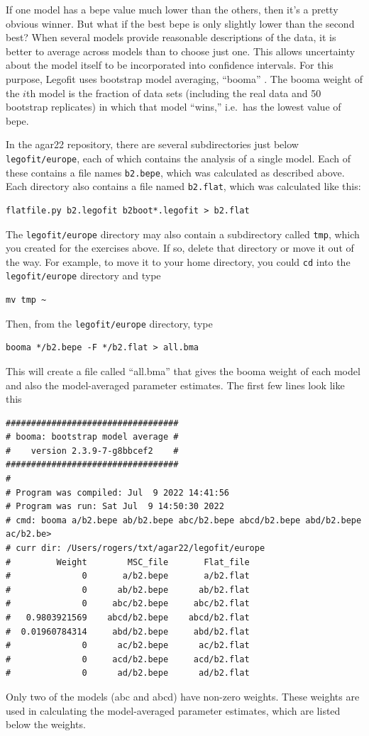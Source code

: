 \documentclass[11pt]{article}
\begin{document}
If one model has a bepe value much lower than the others, then it's a
pretty obvious winner. But what if the best bepe is only slightly
lower than the second best? When several models provide reasonable
descriptions of the data, it is better to average across models than
to choose just one. This allows uncertainty about the model itself to
be incorporated into confidence intervals. For this purpose, Legofit
uses bootstrap model averaging, ``booma''
\citep{Buckland:B-53-603,Rogers:BMC-20-526}. The booma weight of the
$i$th model is the fraction of data sets (including the real data and
50 bootstrap replicates) in which that model ``wins,'' i.e.\ has the
lowest value of bepe.

In the agar22 repository, there are several subdirectories just below
\texttt{legofit/europe}, each of which contains the analysis of a
single model. Each of these contains a file names \texttt{b2.bepe},
which was calculated as described above. Each directory also contains
a file named \texttt{b2.flat}, which was calculated like this:
\begin{verbatim}
flatfile.py b2.legofit b2boot*.legofit > b2.flat
\end{verbatim}
The \texttt{legofit/europe} directory may also contain a subdirectory
called \texttt{tmp}, which you created for the exercises above. If so,
delete that directory or move it out of the way. For example, to move
it to your home directory, you could \texttt{cd} into the
\texttt{legofit/europe} directory and type
\begin{verbatim}
mv tmp ~
\end{verbatim}
Then, from the \texttt{legofit/europe} directory, type
\begin{verbatim}
booma */b2.bepe -F */b2.flat > all.bma
\end{verbatim}
This will create a file called ``all.bma'' that gives the booma weight
of each model and also the model-averaged parameter estimates. The
first few lines look like this
\begin{verbatim}
##################################
# booma: bootstrap model average #
#    version 2.3.9-7-g8bbcef2    #
##################################
#
# Program was compiled: Jul  9 2022 14:41:56
# Program was run: Sat Jul  9 14:50:30 2022
# cmd: booma a/b2.bepe ab/b2.bepe abc/b2.bepe abcd/b2.bepe abd/b2.bepe ac/b2.be>
# curr dir: /Users/rogers/txt/agar22/legofit/europe
#         Weight        MSC_file       Flat_file
#              0       a/b2.bepe       a/b2.flat
#              0      ab/b2.bepe      ab/b2.flat
#              0     abc/b2.bepe     abc/b2.flat
#   0.9803921569    abcd/b2.bepe    abcd/b2.flat
#  0.01960784314     abd/b2.bepe     abd/b2.flat
#              0      ac/b2.bepe      ac/b2.flat
#              0     acd/b2.bepe     acd/b2.flat
#              0      ad/b2.bepe      ad/b2.flat
\end{verbatim}
Only two of the models (abc and abcd) have non-zero weights.  These
weights are used in calculating the model-averaged parameter
estimates, which are listed below the weights.
\end{document}
